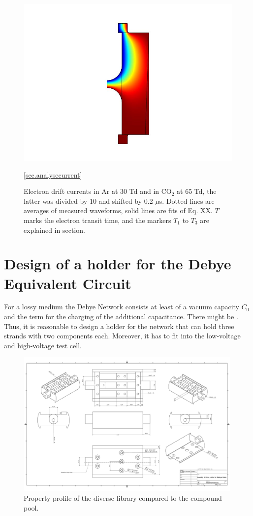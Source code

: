 \begin{figure}[htbp]
	\centering
	\includegraphics{figures/COMSOL_Beispielbild.jpg}		
	\caption[Kurze Abbildungsbeschreibung]{Electron drift currents in Ar at 30 Td and in CO$_2$ at 65 Td, the latter was divided by 10 and shifted by 0.2 $\mu$s. Dotted lines are averages of measured waveforms, solid lines are fits of Eq. XX. $T$ marks the electron transit time, and the markers $T_1$ to $T_3$ are explained in section.} \ref{sec.analysecurrent}
	\label{fig.waveforms}
\end{figure}


\section{Design of a holder for the Debye Equivalent Circuit}
For a lossy medium the Debye Network consists at least of a vacuum capacity $C_0$ and the term for the charging of the additional capacitance. There might be . Thus, it is reasonable to design a holder for the network that can hold three strands with two components each. Moreover, it has to fit into the low-voltage and high-voltage test cell. 

\newpage

\begin{figure}
\includegraphics[width=0.99\textwidth]{figures/Gesamtanordnung.pdf}
    \caption{Property profile of the diverse library compared to the compound pool.}
    
   \end{figure}	
\newpage
    

